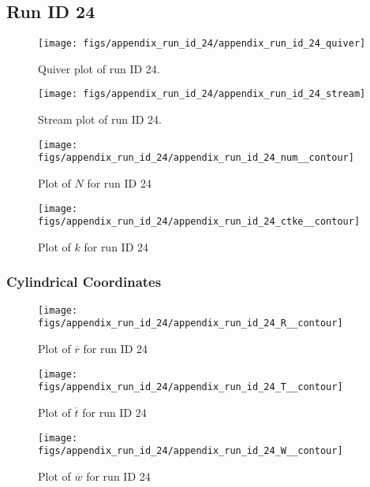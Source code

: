 \subsection{Run ID 24}
\begin{figure}[H]
\centering
\texttt{[image: figs/appendix\_run\_id\_24/appendix\_run\_id\_24\_quiver]}
\caption{Quiver plot of run ID 24.}
\label{fig:appendix_run_id_24_quiver}
\end{figure}


\begin{figure}[H]
\centering
\texttt{[image: figs/appendix\_run\_id\_24/appendix\_run\_id\_24\_stream]}
\caption{Stream plot of run ID 24.}
\label{fig:appendix_run_id_24_stream}
\end{figure}


\begin{figure}[H]
\centering
\texttt{[image: figs/appendix\_run\_id\_24/appendix\_run\_id\_24\_num\_\_contour]}
\caption{Plot of $N$ for run ID 24}
\label{fig:appendix_run_id_24_num__contour}
\end{figure}


\begin{figure}[H]
\centering
\texttt{[image: figs/appendix\_run\_id\_24/appendix\_run\_id\_24\_ctke\_\_contour]}
\caption{Plot of $k$ for run ID 24}
\label{fig:appendix_run_id_24_ctke__contour}
\end{figure}


\subsubsection{Cylindrical Coordinates}
\begin{figure}[H]
\centering
\texttt{[image: figs/appendix\_run\_id\_24/appendix\_run\_id\_24\_R\_\_contour]}
\caption{Plot of $\overline{r}$ for run ID 24}
\label{fig:appendix_run_id_24_R__contour}
\end{figure}


\begin{figure}[H]
\centering
\texttt{[image: figs/appendix\_run\_id\_24/appendix\_run\_id\_24\_T\_\_contour]}
\caption{Plot of $\overline{t}$ for run ID 24}
\label{fig:appendix_run_id_24_T__contour}
\end{figure}


\begin{figure}[H]
\centering
\texttt{[image: figs/appendix\_run\_id\_24/appendix\_run\_id\_24\_W\_\_contour]}
\caption{Plot of $\overline{w}$ for run ID 24}
\label{fig:appendix_run_id_24_W__contour}
\end{figure}


